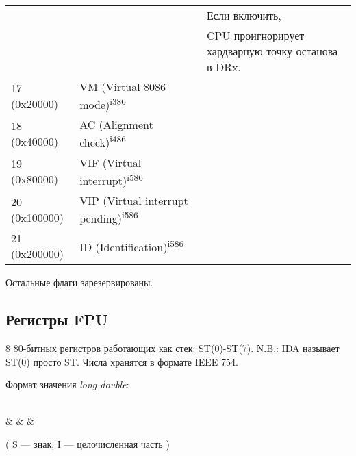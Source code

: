 \begin{center}
\begin{tabular}{ | l | l | l | }
             &                  & Если включить, \\
	     &                  & CPU проигнорирует хардварную точку останова в DRx. \\
\hline
17 (0x20000) & VM (Virtual 8086 mode)\textsuperscript{i386} & \\
\hline
18 (0x40000) & AC (Alignment check)\textsuperscript{i486} & \\
\hline
19 (0x80000) & VIF (Virtual interrupt)\textsuperscript{i586} & \\
\hline
20 (0x100000) & VIP (Virtual interrupt pending)\textsuperscript{i586} & \\
\hline
21 (0x200000) & ID (Identification)\textsuperscript{i586} & \\
\hline
\end{tabular}
\end{center}
\normalsize

Остальные флаги зарезервированы.

\subsection{Регистры FPU}

8 80-битных регистров работающих как стек: ST(0)-ST(7).
N.B.: \ac{IDA} называет ST(0) просто ST.
Числа хранятся в формате IEEE 754.

Формат значения \emph{long double}:

\bigskip
\begin{center}
\begingroup
\makeatletter
\let\saved@bf@bitformatting\bf@bitformatting
\renewcommand*{\bf@bitformatting}{%
	\ifnum\value{header@val}=21 %
	\value{header@val}=62 %
	\else\ifnum\value{header@val}=22 %
	\value{header@val}=63 %
	\else\ifnum\value{header@val}=23 %
	\value{header@val}=64 %
	\else\ifnum\value{header@val}=30 %
	\value{header@val}=78 %
	\else\ifnum\value{header@val}=31 %
	\value{header@val}=79 %
	\fi\fi\fi\fi\fi
	\saved@bf@bitformatting
}%
\begin{bytefield}[bitwidth=0.03\linewidth]{32}
	 \\
	 &
	 &
	 &
\end{bytefield}
\endgroup
\end{center}

\begin{center}
( S --- знак, I --- целочисленная часть )
\end{center}

